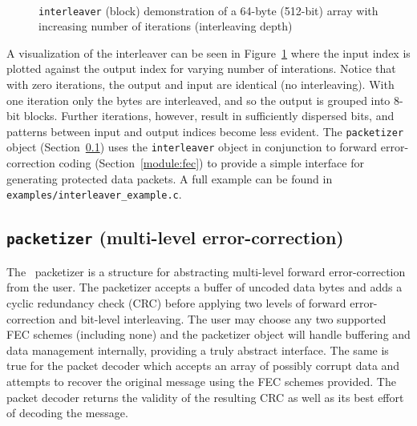 \begin{figure}
\centering
\mbox{
   \quad
   \quad
}
\mbox{
   \quad
   \quad
}
\mbox{
   \quad
}
\caption{{\tt interleaver} (block) demonstration of a 64-byte (512-bit) array
with increasing number of iterations (interleaving depth)}
\label{fig:module:framing:interleaver:scatterplot}
\end{figure}
%
A visualization of the interleaver can be seen in
Figure~\ref{fig:module:framing:interleaver:scatterplot}
where the input index is plotted against the output index for varying number
of interations.
Notice that with zero iterations, the output and input are identical (no
interleaving).
With one iteration only the bytes are interleaved, and so the output is
grouped into 8-bit blocks.
Further iterations, however, result in sufficiently dispersed bits, and
patterns between input and output indices become less evident.
%
The {\tt packetizer} object (Section~\ref{module:framing:packetizer}) uses the
{\tt interleaver} object in conjunction to forward error-correction coding
(Section~\ref{module:fec}) to provide a simple interface for generating
protected data packets.
A full example can be found in {\tt examples/interleaver\_example.c}.


%
%
\subsection{{\tt packetizer} (multi-level error-correction)}
\label{module:framing:packetizer}
The \liquid\ packetizer is a structure for abstracting multi-level forward
error-correction from the user.
The packetizer accepts a buffer of uncoded data bytes and adds a
cyclic redundancy check (CRC) before applying two levels of forward
error-correction and bit-level interleaving.
The user may choose any two supported FEC schemes (including none) and the
packetizer object will handle buffering and data management internally,
providing a truly abstract interface.
The same is true for the packet decoder which accepts an array
of possibly corrupt data and attempts to recover the original message using
the FEC schemes provided.
The packet decoder returns the validity of the resulting CRC as well as its
best effort of decoding the message.

